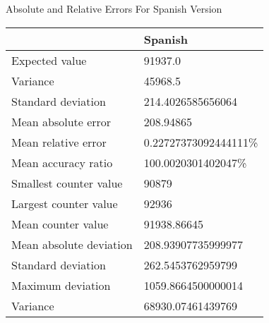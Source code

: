 \documentclass[]{revdetua}
\begin{document}
\begin{table}[!ht]
    \centering
    Absolute and Relative Errors For Spanish Version\linebreak\linebreak
    \begin{tabular}{|l|l|}
    \hline
        ~ & Spanish \\ \hline
        Expected value & 91937.0 \\ \hline
        Variance & 45968.5 \\ \hline
        Standard deviation & 214.4026585656064 \\ \hline
        Mean absolute error & 208.94865 \\ \hline
        Mean relative error & 0.22727373092444111\% \\ \hline
        Mean accuracy ratio & 100.0020301402047\% \\ \hline
        Smallest counter value & 90879 \\ \hline
        Largest counter value & 92936 \\ \hline
        Mean counter value & 91938.86645 \\ \hline
        Mean absolute deviation & 208.93907735999977 \\ \hline
        Standard deviation & 262.5453762959799 \\ \hline
        Maximum deviation & 1059.8664500000014 \\ \hline
        Variance & 68930.07461439769 \\ \hline
    \end{tabular}
\end{table}
\end{document}
